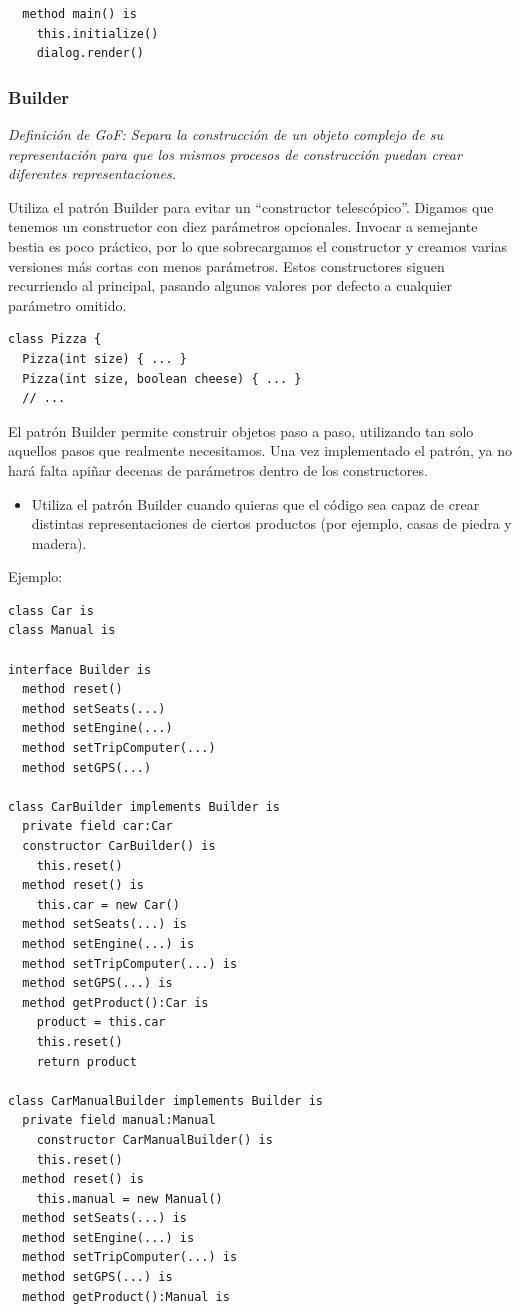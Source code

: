 \documentclass{article}
\begin{document}
\begin{multicols}{2}
\begin{verbatim}
  method main() is
    this.initialize()
    dialog.render()
\end{verbatim}

\subsubsection{Builder}
\textit{Definición de GoF: Separa la construcción de un objeto complejo de su representación para que los mismos procesos de construcción puedan crear diferentes representaciones.}

Utiliza el patrón Builder para evitar un “constructor telescópico”. Digamos que tenemos un constructor con diez parámetros opcionales. Invocar a semejante bestia es poco práctico, por lo que sobrecargamos el constructor y creamos varias versiones más cortas con menos parámetros. Estos constructores siguen recurriendo al principal, pasando algunos valores por defecto a cualquier parámetro omitido.
\begin{verbatim}
class Pizza {
  Pizza(int size) { ... }
  Pizza(int size, boolean cheese) { ... }
  // ...
\end{verbatim}
El patrón Builder permite construir objetos paso a paso, utilizando tan solo aquellos pasos que realmente necesitamos. Una vez implementado el patrón, ya no hará falta apiñar decenas de parámetros dentro de los constructores.

\begin{itemize}
    \item Utiliza el patrón Builder cuando quieras que el código sea capaz de crear distintas representaciones de ciertos productos (por ejemplo, casas de piedra y madera).
\end{itemize} 
Ejemplo:
\begin{verbatim}
class Car is
class Manual is

interface Builder is
  method reset()
  method setSeats(...)
  method setEngine(...)
  method setTripComputer(...)
  method setGPS(...)

class CarBuilder implements Builder is
  private field car:Car
  constructor CarBuilder() is
    this.reset()
  method reset() is
    this.car = new Car()
  method setSeats(...) is
  method setEngine(...) is
  method setTripComputer(...) is
  method setGPS(...) is
  method getProduct():Car is
    product = this.car
    this.reset()
    return product

class CarManualBuilder implements Builder is
  private field manual:Manual
    constructor CarManualBuilder() is
    this.reset()
  method reset() is
    this.manual = new Manual()
  method setSeats(...) is
  method setEngine(...) is
  method setTripComputer(...) is
  method setGPS(...) is
  method getProduct():Manual is


\end{verbatim}
\end{multicols}
\end{document}
